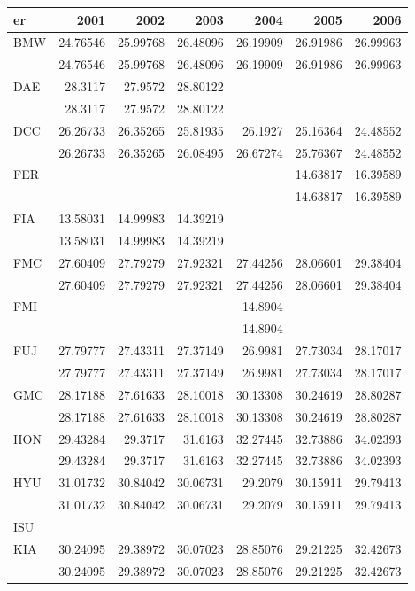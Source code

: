\begin{tabular}{lrrrrrr}
\toprule
er & 2001 & 2002 & 2003 & 2004 & 2005 & 2006 \\
\midrule
BMW & 24.76546 & 25.99768 & 26.48096 & 26.19909 & 26.91986 & 26.99963 \\
 & 24.76546 & 25.99768 & 26.48096 & 26.19909 & 26.91986 & 26.99963 \\
DAE & 28.3117 & 27.9572 & 28.80122 &  &  &  \\
 & 28.3117 & 27.9572 & 28.80122 &  &  &  \\
DCC & 26.26733 & 26.35265 & 25.81935 & 26.1927 & 25.16364 & 24.48552 \\
 & 26.26733 & 26.35265 & 26.08495 & 26.67274 & 25.76367 & 24.48552 \\
FER &  &  &  &  & 14.63817 & 16.39589 \\
 &  &  &  &  & 14.63817 & 16.39589 \\
FIA & 13.58031 & 14.99983 & 14.39219 &  &  &  \\
 & 13.58031 & 14.99983 & 14.39219 &  &  &  \\
FMC & 27.60409 & 27.79279 & 27.92321 & 27.44256 & 28.06601 & 29.38404 \\
 & 27.60409 & 27.79279 & 27.92321 & 27.44256 & 28.06601 & 29.38404 \\
FMI &  &  &  & 14.8904 &  &  \\
 &  &  &  & 14.8904 &  &  \\
FUJ & 27.79777 & 27.43311 & 27.37149 & 26.9981 & 27.73034 & 28.17017 \\
 & 27.79777 & 27.43311 & 27.37149 & 26.9981 & 27.73034 & 28.17017 \\
GMC & 28.17188 & 27.61633 & 28.10018 & 30.13308 & 30.24619 & 28.80287 \\
 & 28.17188 & 27.61633 & 28.10018 & 30.13308 & 30.24619 & 28.80287 \\
HON & 29.43284 & 29.3717 & 31.6163 & 32.27445 & 32.73886 & 34.02393 \\
 & 29.43284 & 29.3717 & 31.6163 & 32.27445 & 32.73886 & 34.02393 \\
HYU & 31.01732 & 30.84042 & 30.06731 & 29.2079 & 30.15911 & 29.79413 \\
 & 31.01732 & 30.84042 & 30.06731 & 29.2079 & 30.15911 & 29.79413 \\
ISU &  &  &  &  &  &  \\
KIA & 30.24095 & 29.38972 & 30.07023 & 28.85076 & 29.21225 & 32.42673 \\
 & 30.24095 & 29.38972 & 30.07023 & 28.85076 & 29.21225 & 32.42673 \\

\end{tabular}
